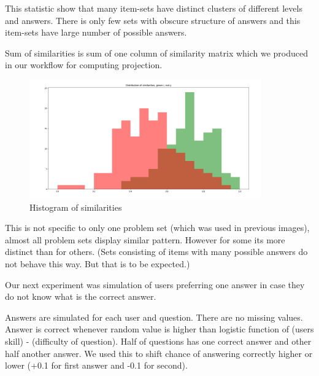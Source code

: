 \documentclass[
  digital, %
  table,   %
  nolof,     %
  nolot,     %
  nocover
]{fithesis3}
\begin{document}
This statistic show that many item-sets have distinct clusters of different levels and answers. There is only few sets with obscure structure of answers and this item-sets have large number of possible answers.


Sum of similarities is sum of one column of similarity matrix which we
produced in our workflow for computing projection.

\begin{figure}
  \begin{center}
    \includegraphics[width=10cm]{img/iy_histogram}
  \end{center}
  \caption{Histogram of similarities}
  \label{ref:iyhistogram}
\end{figure}



This is not specific to only one problem set (which was used in previous
images), almost all problem sets display similar pattern. However for
some its more distinct than for others. (Sets consisting of items with
many possible answers do not behave this way. But that is to be
expected.)


Our next experiment was simulation of users preferring one answer in
case they do not know what is the correct answer.

Answers are simulated for each user and question. There are no missing
values. Answer is correct whenever random value is higher than logistic
function of (users skill) - (difficulty of question). Half of questions
has one correct answer and other half another answer. We used this to
shift chance of answering correctly higher or lower (+0.1 for first
answer and -0.1 for second).

\end{document}

